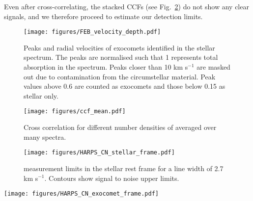 \documentclass{aa}
\newcommand{\kms}{km s$^{-1}$}
\begin{document}
Even after cross-correlating, the stacked CCFs (see Fig.~\ref{fig:ccf_mean}) do not show any clear signals, and we therefore proceed to estimate our detection limits.

\begin{figure}
    \begin{centering}
        \texttt{[image: figures/FEB\_velocity\_depth.pdf]}
        \caption{Peaks and radial velocities of exocomets identified in the stellar spectrum.
        The peaks are normalised such that 1 represents total absorption in the spectrum.
        Peaks closer than 10 \kms{} are masked out due to contamination from the circumstellar material.
        Peak values above 0.6 are counted as exocomets and those below 0.15 as stellar only.}
        \label{fig:FEB_velocity}
    \end{centering}
\end{figure}

\begin{figure}
    \begin{centering}
        \texttt{[image: figures/ccf\_mean.pdf]}
        \caption{Cross correlation for different number densities of  averaged over many spectra.}
        \label{fig:ccf_mean}
    \end{centering}
\end{figure}

\begin{figure}
    \begin{centering}
        \texttt{[image: figures/HARPS\_CN\_stellar\_frame.pdf]}
        \caption{ measurement limits in the stellar rest frame for a  line width of 2.7 \kms{}. Contours show signal to noise upper limits.}
        \label{fig:CN_stellar_frame}
    \end{centering}
\end{figure}

\begin{figure*}
    \begin{centering}
        \texttt{[image: figures/HARPS\_CN\_exocomet\_frame.pdf]}
        \caption{ measurement limits in the exocomet frame for a  line width of 2.7, 10 and 20 \kms{}. Contours show signal to noise upper limits.}
        \label{fig:CN_exocomet_frame}
    \end{centering}
\end{figure*}
\end{document}
